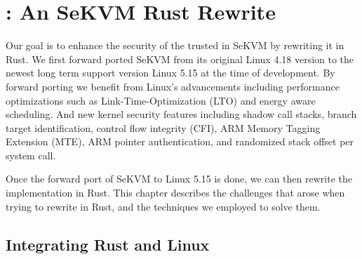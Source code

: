 \chapter{\rustsec{}: An SeKVM Rust Rewrite}
\label{sec:rewrite}


Our goal is to enhance the security of the trusted \secore{} in SeKVM by
rewriting it in Rust. We first forward ported SeKVM from its original
Linux 4.18 version to the newest long term support version Linux 5.15 at the
time of development.
By forward porting we benefit from Linux's advancements including performance
optimizations such as Link-Time-Optimization (LTO) and energy aware scheduling.
And new kernel security features including  shadow call stacks,
branch target identification, control flow integrity (CFI), ARM Memory Tagging
Extension (MTE), ARM pointer authentication, and randomized stack offset per
system call.


Once the forward port of SeKVM to Linux 5.15 is done, we can then rewrite
the implementation in Rust.
This chapter describes the challenges that arose when trying to rewrite
\secore{} in Rust, and the techniques we employed to solve them.

\section{Integrating Rust and Linux}

%

